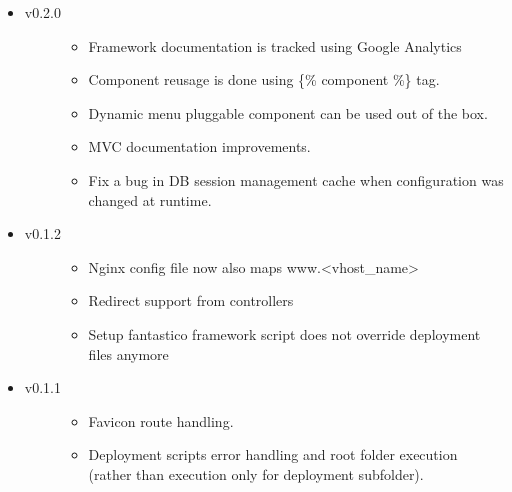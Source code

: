 \documentclass[letterpaper,10pt,english]{sphinxmanual}
\begin{document}
\begin{itemize}
\item {} \begin{description}
\item[{v0.2.0}] \leavevmode\begin{itemize}
\item {} 
Framework documentation is tracked using Google Analytics

\item {} 
Component reusage is done using \{\% component \%\} tag.

\item {} 
Dynamic menu pluggable component can be used out of the box.

\item {} 
MVC documentation improvements.

\item {} 
Fix a bug in DB session management cache when configuration was changed at runtime.

\end{itemize}

\end{description}

\item {} \begin{description}
\item[{v0.1.2}] \leavevmode\begin{itemize}
\item {} 
Nginx config file now also maps www.\textless{}vhost\_name\textgreater{}

\item {} 
Redirect support from controllers

\item {} 
Setup fantastico framework script does not override deployment files anymore

\end{itemize}

\end{description}

\item {} \begin{description}
\item[{v0.1.1}] \leavevmode\begin{itemize}
\item {} 
Favicon route handling.

\item {} 
Deployment scripts error handling and root folder execution (rather than execution only for deployment subfolder).


\end{itemize}
\end{description}
\end{itemize}
\end{document}
